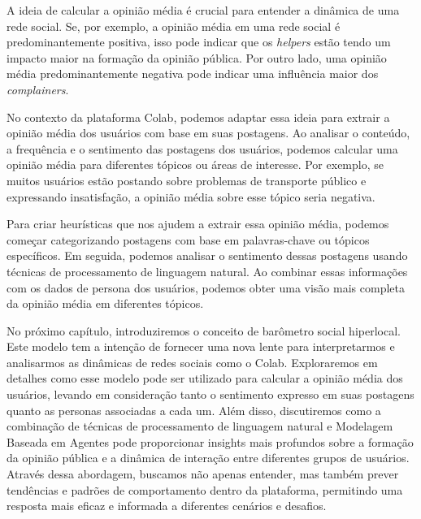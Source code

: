 A ideia de calcular a opinião média é crucial para entender a dinâmica de uma rede social. Se, por exemplo, a opinião média em uma rede social é predominantemente positiva, isso pode indicar que os \textit{helpers} estão tendo um impacto maior na formação da opinião pública. Por outro lado, uma opinião média predominantemente negativa pode indicar uma influência maior dos \textit{complainers}.

No contexto da plataforma Colab, podemos adaptar essa ideia para extrair a opinião média dos usuários com base em suas postagens. Ao analisar o conteúdo, a frequência e o sentimento das postagens dos usuários, podemos calcular uma opinião média para diferentes tópicos ou áreas de interesse. Por exemplo, se muitos usuários estão postando sobre problemas de transporte público e expressando insatisfação, a opinião média sobre esse tópico seria negativa.

Para criar heurísticas que nos ajudem a extrair essa opinião média, podemos começar categorizando postagens com base em palavras-chave ou tópicos específicos. Em seguida, podemos analisar o sentimento dessas postagens usando técnicas de processamento de linguagem natural. Ao combinar essas informações com os dados de persona dos usuários, podemos obter uma visão mais completa da opinião média em diferentes tópicos.

No próximo capítulo, introduziremos o conceito de barômetro social hiperlocal. Este modelo tem a intenção de fornecer uma nova lente para interpretarmos e analisarmos as dinâmicas de redes sociais como o Colab. Exploraremos em detalhes como esse modelo pode ser utilizado para calcular a opinião média dos usuários, levando em consideração tanto o sentimento expresso em suas postagens quanto as personas associadas a cada um. Além disso, discutiremos como a combinação de técnicas de processamento de linguagem natural e Modelagem Baseada em Agentes pode proporcionar insights mais profundos sobre a formação da opinião pública e a dinâmica de interação entre diferentes grupos de usuários. Através dessa abordagem, buscamos não apenas entender, mas também prever tendências e padrões de comportamento dentro da plataforma, permitindo uma resposta mais eficaz e informada a diferentes cenários e desafios.